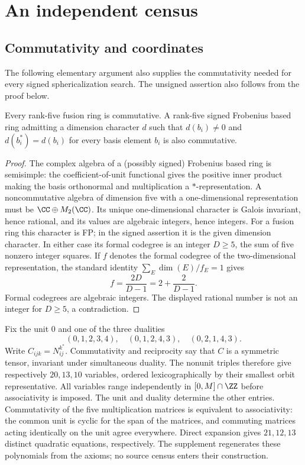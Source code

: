 \section{An independent census}\label{sec:data}
\subsection{Commutativity and coordinates}
The following elementary argument also supplies the commutativity needed
for every signed sphericalization search. The unsigned assertion also follows from the proof below.

\begin{lemma}\label{lem:commutativity}
Every rank-five fusion ring is commutative. A rank-five signed Frobenius
based ring admitting a dimension character $d$ such that
$d(b_i)\ne0$ and $d(b_i^*)=d(b_i)$ for every basis element $b_i$ is also
commutative.
\end{lemma}
\begin{proof}
The complex algebra of a (possibly signed) Frobenius based ring is
semisimple: the coefficient-of-unit functional gives the positive
inner product making the basis orthonormal and multiplication a
$*$-representation. A noncommutative algebra of dimension five with a
one-dimensional representation must be $\CC\oplus M_2(\CC)$.
Its unique one-dimensional character is Galois invariant, hence rational,
and its values are algebraic integers, hence integers.
For a fusion ring this character is FP; in the signed assertion it is
the given dimension character. In either case its formal codegree is an
integer $D\geq5$, the sum of five nonzero integer squares.
If $f$ denotes the formal codegree of the two-dimensional representation,
the standard identity $\sum_E\dim(E)/f_E=1$ gives
\[
 f=\frac{2D}{D-1}=2+\frac2{D-1}.
\]
Formal codegrees are algebraic integers. The displayed rational number
is not an integer for $D\geq5$, a contradiction.
\end{proof}

Fix the unit $0$ and one of the three dualities
\[
(0,1,2,3,4),\quad(0,1,2,4,3),\quad(0,2,1,4,3).
\]
Write $C_{ijk}=N_{ij}^{k^*}$. Commutativity and reciprocity say that
$C$ is a symmetric tensor, invariant under simultaneous duality.
The nonunit triples therefore give respectively $20,13,10$ variables,
ordered lexicographically by their smallest orbit representative.
All variables range independently in $[0,M]\cap\ZZ$ before
associativity is imposed. The unit and duality determine the other
entries. Commutativity of the five multiplication matrices is equivalent
to associativity: the common unit is cyclic for the span of the matrices,
and commuting matrices acting identically on the unit agree everywhere.
Direct expansion gives $21,12,13$ distinct quadratic equations,
respectively. The supplement regenerates these polynomials from the
axioms; no source census enters their construction.

